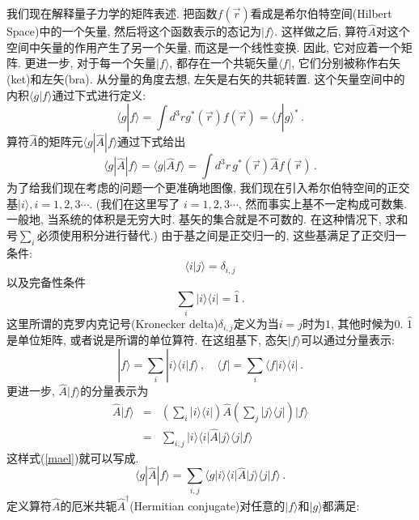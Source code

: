 \documentclass[b5paper]{book}
\begin{document}
我们现在解释量子力学的矩阵表述. 把函数$f(\vec{r})$看成是希尔伯特空间(Hilbert Space)中的一个矢量, 然后将这个函数表示的态记为$|f\rangle$. 这样做之后, 算符$\hat{A}$对这个空间中矢量的作用产生了另一个矢量, 而这是一个线性变换. 因此, 它对应着一个矩阵. 更进一步, 对于每一个矢量$|f\rangle$, 都存在一个共轭矢量$\langle f|$, 它们分别被称作右矢(ket)和左矢(bra). 从分量的角度去想, 左矢是右矢的共轭转置. 这个矢量空间中的内积$\langle g|f\rangle$通过下式进行定义:
\begin{equation}
\langle g|f\rangle =\int d^3r g^*(\vec{r})f(\vec{r})=\langle f|g\rangle^*\,.
\end{equation}
算符$\hat{A}$的矩阵元$\langle g|\hat{A}|f\rangle$通过下式给出
\begin{equation}\label{mael}
\langle g|\hat{A}|f\rangle=\langle g|\hat{A}f\rangle=\int d^3r\,g^*(\vec{r})\hat{A}f(\vec{r})\,.
\end{equation}
为了给我们现在考虑的问题一个更准确地图像, 我们现在引入希尔伯特空间的正交基$|i\rangle, i=1,2,3\cdots$. (我们在这里写了 $i=1,2,3\cdots$, 然而事实上基不一定构成可数集. 一般地, 当系统的体积是无穷大时. 基矢的集合就是不可数的. 在这种情况下, 求和号$\sum_i$必须使用积分进行替代.) 由于基之间是正交归一的, 这些基满足了正交归一条件:
\begin{equation}
\langle i|j\rangle=\delta_{i,j}
\end{equation}
以及完备性条件
\begin{equation}
\sum_{i}|i\rangle\langle i|=\hat{1}\,.
\end{equation}
这里所谓的克罗内克记号(Kronecker delta)$\delta_{i,j}$定义为当$i=j$时为$1$, 其他时候为$0$. $\hat{1}$是单位矩阵, 或者说是所谓的单位算符. 在这组基下, 态矢$|f\rangle$可以通过分量表示:
\begin{equation}
|f\rangle=\sum_i |i\rangle\langle i|f\rangle\,,\quad \langle f|=\sum_i\langle f|i\rangle \langle i|\,.
\end{equation}
更进一步, $\hat{A}|f\rangle$的分量表示为
\begin{eqnarray}
\hat{A}|f\rangle&=&\left(\sum_i |i\rangle \langle i|\right)\hat{A}\left(\sum_j |j\rangle\langle j|\right)|f\rangle\nonumber\\
&=&\sum_{i,j}|i\rangle \langle i|\hat{A}|j\rangle \langle j|f\rangle
\end{eqnarray}
这样式(\ref{mael})就可以写成.
\begin{equation}
\langle g|\hat{A}|f\rangle=\sum_{i,j}\langle g|i\rangle \langle i|\hat{A}|j\rangle\langle j|f\rangle\,.
\end{equation}
定义算符$\hat{A}$的厄米共轭$\hat{A}^\dagger$(Hermitian conjugate)对任意的$|f\rangle$和$|g\rangle$都满足:
\end{document}
